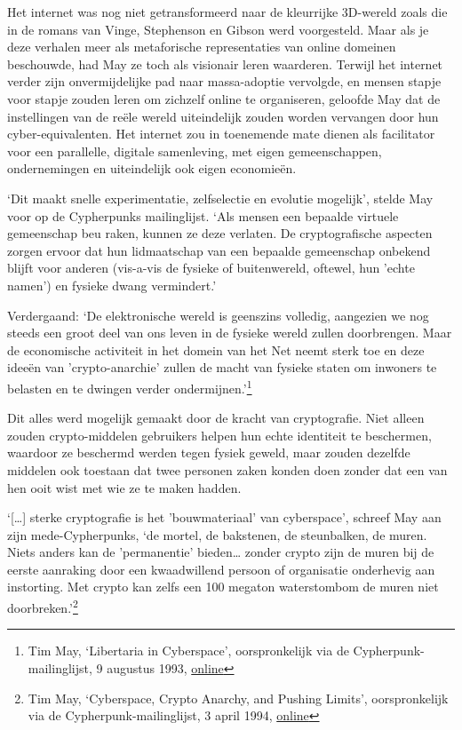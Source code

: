 \documentclass[smalldemyvopaper,11pt,twoside,onecolumn,openright,extrafontsizes,hidelinks]{memoir}
\begin{document}
Het internet was nog niet getransformeerd naar de kleurrijke 3D-wereld
zoals die in de romans van Vinge, Stephenson en Gibson werd voorgesteld.
Maar als je deze verhalen meer als metaforische representaties van
online domeinen beschouwde, had May ze toch als visionair leren
waarderen. Terwijl het internet verder zijn onvermijdelijke pad naar
massa-adoptie vervolgde, en mensen stapje voor stapje zouden leren om
zichzelf online te organiseren, geloofde May dat de instellingen van de
reële wereld uiteindelijk zouden worden vervangen door hun
cyber-equivalenten. Het internet zou in toenemende mate dienen als
facilitator voor een parallelle, digitale samenleving, met eigen
gemeenschappen, ondernemingen en uiteindelijk ook eigen economieën.

`Dit maakt snelle experimentatie, zelfselectie en evolutie mogelijk',
stelde May voor op de Cypherpunks mailinglijst. `Als mensen een bepaalde
virtuele gemeenschap beu raken, kunnen ze deze verlaten. De
cryptografische aspecten zorgen ervoor dat hun lidmaatschap van een
bepaalde gemeenschap onbekend blijft voor anderen (vis-a-vis de fysieke
of buitenwereld, oftewel, hun 'echte namen') en fysieke dwang
vermindert.'

Verdergaand: `De elektronische wereld is geenszins volledig, aangezien
we nog steeds een groot deel van ons leven in de fysieke wereld zullen
doorbrengen. Maar de economische activiteit in het domein van het Net
neemt sterk toe en deze ideeën van 'crypto-anarchie' zullen de macht van
fysieke staten om inwoners te belasten en te dwingen verder
ondermijnen.'\footnote{Tim May, `Libertaria in Cyberspace',
  oorspronkelijk via de Cypherpunk-mailinglijst, 9 augustus 1993,
  \href{https://cypherpunks.venona.com/date/1993/08/msg00168.html}{online}}

Dit alles werd mogelijk gemaakt door de kracht van cryptografie. Niet
alleen zouden crypto-middelen gebruikers helpen hun echte identiteit te
beschermen, waardoor ze beschermd werden tegen fysiek geweld, maar
zouden dezelfde middelen ook toestaan dat twee personen zaken konden
doen zonder dat een van hen ooit wist met wie ze te maken hadden.

`{[}\ldots{]} sterke cryptografie is het 'bouwmateriaal' van
cyberspace', schreef May aan zijn mede-Cypherpunks, `de mortel, de
bakstenen, de steunbalken, de muren. Niets anders kan de 'permanentie'
bieden\ldots{} zonder crypto zijn de muren bij de eerste aanraking door
een kwaadwillend persoon of organisatie onderhevig aan instorting. Met
crypto kan zelfs een 100 megaton waterstombom de muren niet
doorbreken.'\footnote{Tim May, `Cyberspace, Crypto Anarchy, and Pushing
  Limits', oorspronkelijk via de Cypherpunk-mailinglijst, 3 april 1994,
  \href{https://cypherpunks.venona.com/date/1994/04/msg00096.html}{online}}
\end{document}
